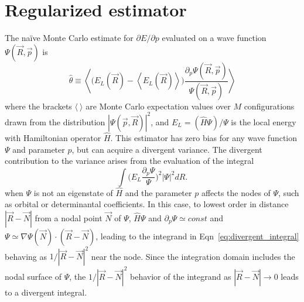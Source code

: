 \documentclass[twocolumn]{revtex4-1}
\begin{document}
\section{Regularized estimator}
The na\"ive Monte Carlo estimate for $\partial E/\partial p$ evaluated on a wave function $\Psi(\vec{R}, \vec{p})$ is 
\begin{equation}
\hat{\theta} \equiv \left\langle \Big(E_L(\vec{R})  - \left\langle E_L(\vec{R}) \right \rangle\Big)\frac{\partial_p \Psi(\vec{R}, \vec{p})}{\Psi(\vec{R}, \vec{p})} \right\rangle
\label{eq:naive_estimator}
\end{equation} 
where the brackets $\langle \ \rangle$ are Monte Carlo expectation values over $M$ configurations drawn from the distribution $|\Psi(\vec{p}, \vec{R})|^2$, and $E_L = (\hat{H}\Psi)/\Psi$ is the local energy with Hamiltonian operator $\hat{H}$.
This estimator has zero bias for any wave function $\Psi$ and parameter $p$, but can acquire a divergent variance.
The divergent contribution to the variance arises from the evaluation of the integral
\begin{equation}
\int \Big(E_L\frac{\partial_p\Psi}{\Psi}\Big)^2 |\Psi|^2 dR.
\label{eq:divergent_integral}
\end{equation}
when $\Psi$ is not an eigenstate of $\hat{H}$ and the parameter $p$ affects the nodes of $\Psi$, such as orbital or determinantal coefficients.
In this case, to lowest order in distance $|\vec{R}-\vec{N}|$ from a nodal point $\vec{N}$ of $\Psi$, $\hat{H}\Psi$ and $\partial_p \Psi \simeq const$ and $\Psi \simeq \nabla \Psi(\vec{N}) \cdot (\vec{R} - \vec{N})$, leading to the integrand in Eqn~\ref{eq:divergent_integral} behaving as $1/|\vec{R}-\vec{N}|^2$ near the node.
Since the integration domain includes the nodal surface of $\Psi$, the $1/|\vec{R}-\vec{N}|^2$ behavior of the integrand as $|\vec{R}-\vec{N}|\rightarrow 0$ leads to a divergent integral.
\end{document}
